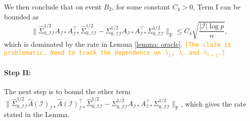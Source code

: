 \documentclass[11pt]{article}
\newcommand{\nb}[1]{\textcolor{orange}{\texttt{[#1]}}}
\newcommand{\AI}{\widehat{A}(\cI)}
\newcommand{\cI}{{\mathcal{I}}}
\newcommand{\0}{{\mathbf{0}}}
\newcommand{\op}{{\mathrm{op}}}
\begin{document}
We then conclude that on event $B_2$, for some constant $C_4>0$, Term I can be bounded as 
\begin{equation*}
    \|\widehat{\Sigma}_{0,\cI\cI}^{1/2}A_{\cI*}A^\top  _{\cI*}\widehat{\Sigma}_{0,\cI\cI}^{1/2}-\Sigma_{0,\cI\cI}^{1/2}A_{\cI*}A^\top  _{\cI*}\Sigma_{0,\cI\cI}^{1/2}\|_\mathrm{F}\leq C_4
   \sqrt{\frac{|\cI|\log p}{n}},
\end{equation*}
which is dominated by the rate in Lemma \ref{lemma: oracle}.
\nb{The claim is problematic. Need to track the dependence on $\lambda_1$, $\lambda_r$ and $\lambda_{r+1}$.}

\paragraph{Step II:}
The next step is to bound the other term $\|\widehat{\Sigma}_{0,\cI\cI}^{1/2}\AI_{\cI*}\AI^\top  _{\cI*}\widehat{\Sigma}_{0,\cI\cI}^{1/2}-\Sigma_{0,\cI\cI}^{1/2}A_{\cI*}A^\top  _{\cI*}\Sigma_{0,\cI\cI}^{1/2}\|_\mathrm{F}$, which gives the rate stated in the Lemma. 
\end{document}
